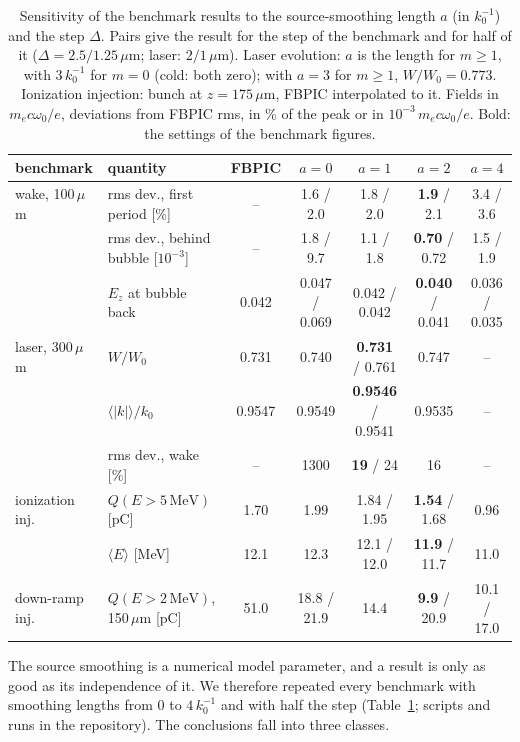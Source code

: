 \documentclass[preprint,12pt]{elsarticle}
\begin{document}
\begin{table}[!htbp]
\caption{Sensitivity of the benchmark results to the source-smoothing length $a$ (in $k_0^{-1}$) and the step $\Delta$. Pairs give the result for the step of the benchmark and for half of it ($\Delta = 2.5/1.25\,\mu$m; laser: $2/1\,\mu$m). Laser evolution: $a$ is the length for $m \ge 1$, with $3\,k_0^{-1}$ for $m = 0$ (cold: both zero); with $a = 3$ for $m \ge 1$, $W/W_0 = 0.773$. Ionization injection: bunch at $z = 175\,\mu$m, FBPIC interpolated to it. Fields in $m_ec\omega_0/e$, deviations from FBPIC rms, in \% of the peak or in $10^{-3}\,m_ec\omega_0/e$. Bold: the settings of the benchmark figures.}\label{tab:sens}
\footnotesize
\begin{tabular}{llccccc}
\toprule
benchmark & quantity & FBPIC & $a = 0$ & $a = 1$ & $a = 2$ & $a = 4$ \\ \midrule
wake, 100\,$\mu$m & rms dev., first period [\%] & -- & 1.6 / 2.0 & 1.8 / 2.0 & \textbf{1.9} / 2.1 & 3.4 / 3.6 \\
 & rms dev., behind bubble [$10^{-3}$] & -- & 1.8 / 9.7 & 1.1 / 1.8 & \textbf{0.70} / 0.72 & 1.5 / 1.9 \\
 & $E_z$ at bubble back & 0.042 & 0.047 / 0.069 & 0.042 / 0.042 & \textbf{0.040} / 0.041 & 0.036 / 0.035 \\
laser, 300\,$\mu$m & $W/W_0$ & 0.731 & 0.740 & \textbf{0.731} / 0.761 & 0.747 & -- \\
 & $\langle|k|\rangle/k_0$ & 0.9547 & 0.9549 & \textbf{0.9546} / 0.9541 & 0.9535 & -- \\
 & rms dev., wake [\%] & -- & 1300 & \textbf{19} / 24 & 16 & -- \\
ionization inj. & $Q(E > 5\,\mathrm{MeV})$ [pC] & 1.70 & 1.99 & 1.84 / 1.95 & \textbf{1.54} / 1.68 & 0.96 \\
 & $\langle E\rangle$ [MeV] & 12.1 & 12.3 & 12.1 / 12.0 & \textbf{11.9} / 11.7 & 11.0 \\
down-ramp inj. & $Q(E > 2\,\mathrm{MeV})$, 150\,$\mu$m [pC] & 51.0 & 18.8 / 21.9 & 14.4 & \textbf{9.9} / 20.9 & 10.1 / 17.0 \\
\bottomrule
\end{tabular}
\end{table}

The source smoothing is a numerical model parameter, and a result is only as good as its independence of it. We therefore repeated every benchmark with smoothing lengths from 0 to $4\,k_0^{-1}$ and with half the step (Table~\ref{tab:sens}; scripts and runs in the repository). The conclusions fall into three classes.
\end{document}
